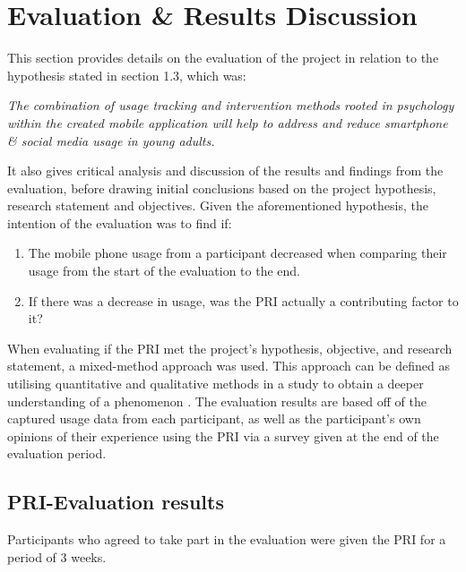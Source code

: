 \documentclass[12pt]{article}
\begin{document}
\newpage


\section{Evaluation \& Results Discussion}
This section provides details on the evaluation of the project in relation to the hypothesis stated in section 1.3, which was: \newline

\noindent\textit{The combination of usage tracking and intervention methods rooted in psychology within the created mobile 
application will help to address and reduce smartphone \& social media usage in young adults.} \newline

It also gives critical analysis and discussion of the results and findings from the evaluation, before drawing initial conclusions based on the
project hypothesis, research statement and objectives. Given the aforementioned hypothesis, the intention of the evaluation was to find if:

\begin{enumerate}
	\item The mobile phone usage from a participant decreased when comparing their usage from the start of the evaluation to the end.
	\item If there was a decrease in usage, was the PRI actually a contributing factor to it?
\end{enumerate}

\noindent When evaluating if the PRI met the project's hypothesis, objective, and research statement, a mixed-method approach was used. This approach can be defined as utilising quantitative and
qualitative methods in a study to obtain a deeper understanding of a phenomenon . The evaluation results are based off of the captured usage 
data from each participant, as well as the participant's own opinions of their experience using the PRI via a survey given at the end of the evaluation period. 


\subsection{PRI-Evaluation results}
Participants who agreed to take part in the evaluation were given the PRI for a period of 3 weeks. 
\end{document}
